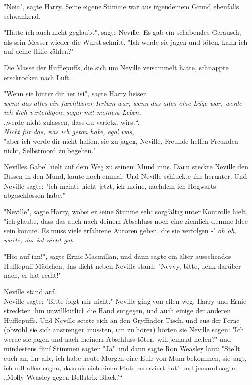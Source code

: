 {"Nein", sagte Harry. Seine eigene Stimme war aus irgendeinem Grund ebenfalls schwankend.

"Hätte ich auch nicht geglaubt", sagte Neville. Es gab ein schabendes Geräusch, als sein Messer wieder die Wurst schnitt. "Ich werde sie jagen und töten, kann ich auf deine Hilfe zählen?"

Die Masse der Hufflepuffs, die sich um Neville versammelt hatte, schnappte erschrocken nach Luft.

"Wenn sie hinter dir her ist", sagte Harry heiser,\\ \emph{wenn das alles ein furchtbarer Irrtum war, wenn das alles eine Lüge war, werde ich dich verteidigen, sogar mit meinem Leben,}\\ „werde nicht zulassen, dass du verletzt wirst“.\\ \emph{Nicht für das, was ich getan habe, egal was,}\\ "aber ich werde dir nicht helfen, sie zu jagen, Neville, Freunde helfen Freunden nicht, Selbstmord zu begehen."

Nevilles Gabel hielt auf dem Weg zu seinem Mund inne. Dann steckte Neville den Bissen in den Mund, kaute noch einmal. Und Neville schluckte ihn herunter. Und Neville sagte: "Ich meinte nicht jetzt, ich meine, nachdem ich Hogwarts abgeschlossen habe."

"Neville", sagte Harry, wobei er seine Stimme sehr sorgfältig unter Kontrolle hielt, "ich glaube, dass das auch nach deinem Abschluss noch eine ziemlich dumme Idee sein könnte. Es muss viele erfahrene Auroren geben, die sie verfolgen -" \emph{oh oh,} \emph{warte, das ist nicht gut -}

"Hör auf ihn!", sagte Ernie Macmillan, und dann sagte ein älter aussehendes Hufflepuff-Mädchen, das dicht neben Neville stand: "Nevvy, bitte, denk darüber nach, er hat recht!"

Neville stand auf.\\ Neville sagte: "Bitte folgt mir nicht." Neville ging von allen weg; Harry und Ernie streckten ihm unwillkürlich die Hand entgegen, und auch einige der anderen Hufflepuffs. Und Neville setzte sich an den Gryffindor-Tisch, und aus der Ferne (obwohl sie sich anstrengen mussten, um zu hören) hörten sie Neville sagen: "Ich werde sie jagen und nach meinem Abschluss töten, will jemand helfen?" und mindestens fünf Stimmen sagten "Ja" und dann sagte Ron Weasley laut: "Stellt\\ euch an, ihr alle, ich habe heute Morgen eine Eule von Mum bekommen, sie sagt, ich soll allen sagen, dass sie sich einen Platz reserviert hat" und jemand sagte „Molly Weasley gegen Bellatrix Black?“

}
